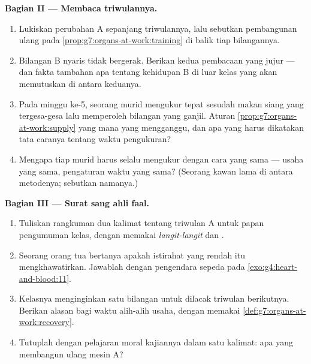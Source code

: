 \begin{problem}
\medskip\noindent\textbf{Bagian II --- Membaca triwulannya.}
\begin{enumerate}[resume]
  \item Lukiskan perubahan A sepanjang triwulannya, lalu sebutkan
        pembangunan ulang pada
        \cref{prop:g7:organs-at-work:training} di balik tiap
        bilangannya.
  \item Bilangan B nyaris tidak bergerak. Berikan kedua pembacaan yang
        jujur --- dan fakta tambahan apa tentang kehidupan B di luar
        kelas yang akan memutuskan di antara keduanya.
  \item Pada minggu ke-5, seorang murid mengukur tepat sesudah makan
        siang yang tergesa-gesa lalu memperoleh bilangan yang ganjil.
        Aturan \cref{prop:g7:organs-at-work:supply} yang mana yang
        mengganggu, dan apa yang harus dikatakan tata caranya tentang
        waktu pengukuran?
  \item Mengapa tiap murid harus selalu mengukur dengan cara yang sama
        --- usaha yang sama, pengaturan waktu yang sama? (Seorang
        kawan lama di antara metodenya; sebutkan namanya.)
\end{enumerate}

\medskip\noindent\textbf{Bagian III --- Surat sang ahli
faal.}
\begin{enumerate}[resume]
  \item Tuliskan rangkuman dua kalimat tentang triwulan A untuk papan
        pengumuman kelas, dengan memakai \emph{langit-langit} dan
        \emph{}.
  \item Seorang orang tua bertanya apakah  istirahat yang
        rendah itu mengkhawatirkan. Jawablah dengan pengendara sepeda
        pada \cref{exo:g4:heart-and-blood:11}.
  \item Kelasnya menginginkan satu bilangan untuk dilacak triwulan
        berikutnya. Berikan alasan bagi waktu  alih-alih
         usaha, dengan memakai
        \cref{def:g7:organs-at-work:recovery}.
  \item Tutuplah dengan pelajaran moral kajiannya dalam satu kalimat:
        apa yang membangun ulang mesin A?
\end{enumerate}
\end{problem}
